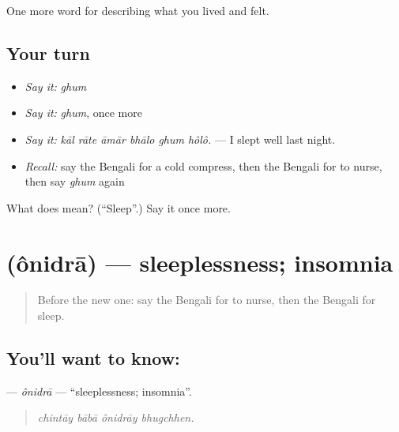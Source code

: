 \begin{grammarlens}[title={What you've built}]
One more word for describing what you lived and felt.
\end{grammarlens}

\subsection*{Your turn}
\begin{itemize}
\raggedright
  \item \emph{Say it:} \emph{ghum}
  \item \emph{Say it:} \emph{ghum}, once more
  \item \emph{Say it:} \emph{kāl rāte āmār bhālo ghum hôlô.} — I slept well last night.
  \item \emph{Recall:} say the Bengali for a cold compress, then the Bengali for to nurse, then say \emph{ghum} again
\end{itemize}

\begin{tcolorbox}[breakable,colback=teal!4,colframe=teal!35!black,title={Before you move on}]
What does  mean? (\textquotedblleft{}Sleep\textquotedblright{}.) Say it once more.
\end{tcolorbox}
\section[\texorpdfstring{\bn{অনিদ্রা} (ônidrā)}{অনিদ্রা (ônidrā)}]{ (ônidrā) — sleeplessness; insomnia}

\label{lesson:BN-C479-onidra}



\begin{quote}
Before the new one: say the Bengali for to nurse, then the Bengali for sleep.
\end{quote}

\subsection*{You'll want to know: }
\textbf{} — \emph{ônidrā} — \textquotedblleft{}sleeplessness; insomnia\textquotedblright{}.

\begin{quote}
   
\end{quote}

\begin{quote}
\emph{chintāy bābā ônidrāy bhugchhen.}
\end{quote}

